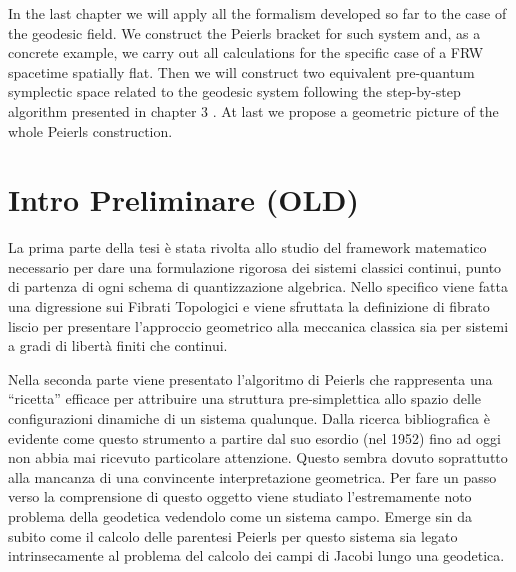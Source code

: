 \documentclass[Main]{subfiles}
\begin{document}
In the last chapter we will apply all the formalism developed so far to the case of the geodesic field.
We construct the Peierls bracket for such system and, as a  concrete example, we carry out all calculations for the specific case of a FRW spacetime spatially flat.
Then we will construct two equivalent pre-quantum symplectic space related to the geodesic system following the step-by-step algorithm presented in chapter 3 .
At last we propose a geometric picture of the whole Peierls construction.


\ifToninus
\section{Intro Preliminare (OLD)}



La prima parte della tesi è stata rivolta allo studio del framework matematico necessario per dare una formulazione rigorosa dei sistemi classici continui, punto di partenza di ogni schema di quantizzazione algebrica.
Nello specifico viene fatta una digressione sui Fibrati Topologici e viene sfruttata la definizione di fibrato liscio per presentare l'approccio geometrico alla meccanica classica sia per sistemi a gradi di libertà finiti che continui.

Nella seconda parte viene presentato l'algoritmo di Peierls che rappresenta una “ricetta” efficace per attribuire una struttura pre-simplettica allo spazio delle configurazioni dinamiche di un sistema qualunque.
Dalla ricerca bibliografica è evidente come questo strumento a partire dal suo esordio (nel 1952) fino ad oggi non abbia mai ricevuto particolare attenzione. Questo sembra dovuto soprattutto alla mancanza di una convincente interpretazione geometrica.
\newline
Per fare un passo verso la comprensione di questo oggetto viene studiato l’estremamente noto problema della geodetica vedendolo come un sistema campo.
Emerge sin da subito come il calcolo delle parentesi Peierls per questo sistema sia legato intrinsecamente al problema del calcolo dei campi di Jacobi lungo una geodetica.
\end{document}
